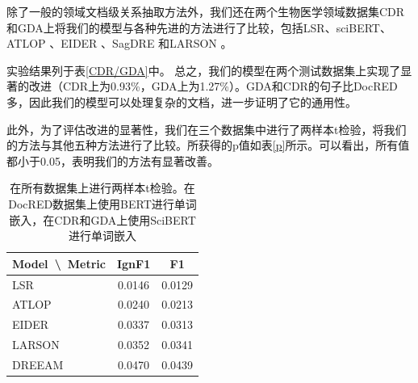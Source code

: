 \documentclass[bachelor]{thesis-uestc}
\begin{document}
除了一般的领域文档级关系抽取方法外，我们还在两个生物医学领域数据集CDR和GDA上将我们的模型与各种先进的方法进行了比较，包括LSR\cite{nan-etal-2020-reasoning}、sciBERT\cite{zhou2021document}、ATLOP \cite{zhou2021document}、EIDER \cite{xie2022eider}、SagDRE \cite{SagDRE}和LARSON \cite{duan-etal-2022-just}。\par
实验结果列于表\ref{CDR/GDA}中。
总之，我们的模型在两个测试数据集上实现了显著的改进（CDR上为0.93\%，GDA上为1.27\%）。GDA和CDR的句子比DocRED多，因此我们的模型可以处理复杂的文档，进一步证明了它的通用性。 \par
此外，为了评估改进的显著性，我们在三个数据集中进行了两样本t检验，将我们的方法与其他五种方法进行了比较。所获得的p值如表\ref{p}所示。可以看出，所有值都小于0.05，表明我们的方法有显著改善。

\begin{table}[]
    \begin{tabular}{lcc}
    \hline
    Model\ \textbackslash \ Metric       & IgnF1            & F1            \\ \hline
    LSR\cite{nan-etal-2020-reasoning}       & 0.0146           & 0.0129           \\
    ATLOP\cite{zhou2021document}  & 0.0240           & 0.0213           \\
    EIDER\cite{xie2022eider}  & 0.0337          & 0.0313          \\
    LARSON\cite{duan-etal-2022-just} & 0.0352          & 0.0341              \\ 
    DREEAM\cite{ma-etal-2023-DREEAM} & 0.0470          & 0.0439              \\ \hline
    \end{tabular}
    \caption{在所有数据集上进行两样本t检验。在DocRED数据集上使用BERT进行单词嵌入，在CDR和GDA上使用SciBERT进行单词嵌入}
    \end{table} \label{p}
\end{document}
